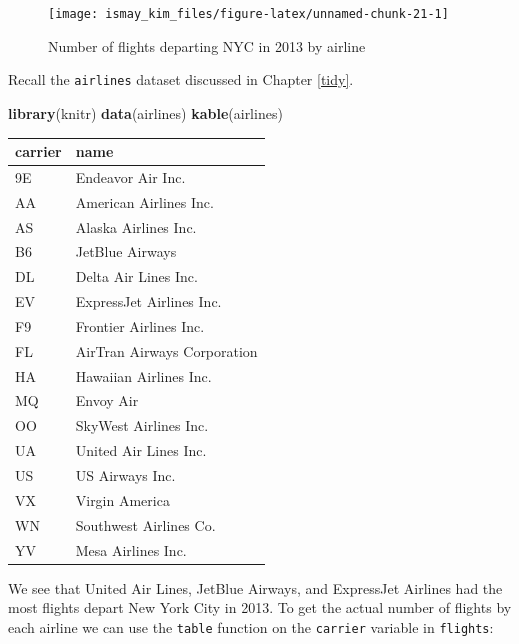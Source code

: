 \documentclass[]{tufte-book}
\newenvironment{Shaded}{\begin{snugshade}}{\end{snugshade}}
\newcommand{\KeywordTok}[1]{\textcolor[rgb]{0.13,0.29,0.53}{\textbf{{#1}}}}
\newcommand{\StringTok}[1]{\textcolor[rgb]{0.31,0.60,0.02}{{#1}}}
\newcommand{\NormalTok}[1]{{#1}}
\begin{document}
\begin{figure}
\texttt{[image: ismay\_kim\_files/figure-latex/unnamed-chunk-21-1]} \caption[Number of flights departing NYC in 2013 by airline]{Number of flights departing NYC in 2013 by airline}\label{fig:unnamed-chunk-21}
\end{figure}

Recall the \texttt{airlines} dataset discussed in Chapter \ref{tidy}.

\begin{Shaded}
\begin{Highlighting}[]
\KeywordTok{library}\NormalTok{(knitr)}
\KeywordTok{data}\NormalTok{(airlines)}
\KeywordTok{kable}\NormalTok{(airlines)}
\end{Highlighting}
\end{Shaded}

\begin{tabular}{l|l}
\hline
carrier & name\\
\hline
9E & Endeavor Air Inc.\\
\hline
AA & American Airlines Inc.\\
\hline
AS & Alaska Airlines Inc.\\
\hline
B6 & JetBlue Airways\\
\hline
DL & Delta Air Lines Inc.\\
\hline
EV & ExpressJet Airlines Inc.\\
\hline
F9 & Frontier Airlines Inc.\\
\hline
FL & AirTran Airways Corporation\\
\hline
HA & Hawaiian Airlines Inc.\\
\hline
MQ & Envoy Air\\
\hline
OO & SkyWest Airlines Inc.\\
\hline
UA & United Air Lines Inc.\\
\hline
US & US Airways Inc.\\
\hline
VX & Virgin America\\
\hline
WN & Southwest Airlines Co.\\
\hline
YV & Mesa Airlines Inc.\\
\hline
\end{tabular}

We see that United Air Lines, JetBlue Airways, and ExpressJet Airlines
had the most flights depart New York City in 2013. To get the actual
number of flights by each airline we can use the \texttt{table} function
on the \texttt{carrier} variable in \texttt{flights}:

\begin{Shaded}
\end{Shaded}
\end{document}
